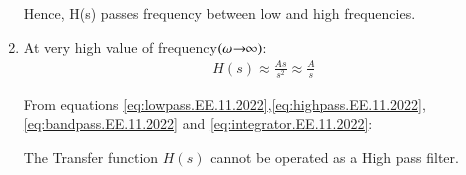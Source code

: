 \documentclass[journal,12pt,twocolumn]{IEEEtran}
\theoremstyle{remark}
\begin{document}
\begin{enumerate}[label=(\roman*)]
\begin{tikzpicture}
\end{tikzpicture}
Hence, H(s) passes frequency between low and high frequencies.
\item 
	At very high value of frequency$(\omega\mkern-4mu \rightarrow\mkern-6mu\infty)$:
\begin{align}
    H(s) \approx \frac{As}{s^2} \approx \frac{A}{s}\label{eq:integrator.EE.11.2022}
\end{align}


From equations \eqref{eq:lowpass.EE.11.2022},\eqref{eq:highpass.EE.11.2022},\eqref{eq:bandpass.EE.11.2022} and \eqref{eq:integrator.EE.11.2022}:

The Transfer function $H(s)$ cannot be operated as a High pass filter.
\end{enumerate}

% 
\end{document}
